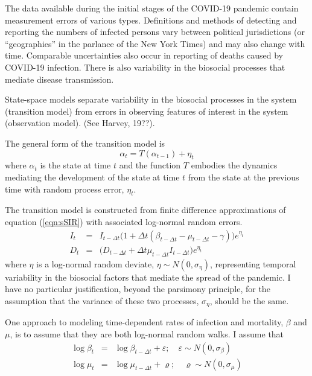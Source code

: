 \documentclass[12pt,letterpaper]{article}
\begin{document}
The data available during the initial stages of the COVID-19 pandemic
contain measurement errors of various types.
Definitions and methods of detecting and reporting the numbers of
infected persons vary between political jurisdictions (or
``geographies'' in the parlance of the New York Times) and may also
change with time.
Comparable uncertainties also occur in reporting of deaths caused
by COVID-19 infection.
There is also variability in the biosocial
processes that mediate disease transmission.

State-space models separate variability in the biosocial
processes in the system (transition model)
from errors in observing features of interest
in the system (observation model).
(See Harvey, 19??).

The general form of the transition model is
\begin{displaymath}
\alpha_t=T(\alpha_{t-1}) + \eta_t
\end{displaymath}
where $\alpha_t$ is the state at time $t$ and 
the function $T$ embodies the dynamics mediating the
development of the state at time $t$ from the state at the previous
time with random process error, $\eta_t$.

The transition model is constructed from finite difference
approximations of equation (\ref{eqn:sSIR}) with associated log-normal
random errors.
\begin{eqnarray}
\label{eqn:sSIRfd}
I_t &=& I_{t-\Delta t}\big(1+\Delta t(\beta_{t-\Delta t} - \mu_{t-\Delta t}
- \gamma)\big)e^{\eta_t}\\
D_t &=& \big(D_{t-\Delta t} + \Delta t \mu_{t-\Delta t}I_{t-\Delta
t}\big)e^{\eta_t}
\end{eqnarray}
where $\eta$ is a log-normal random deviate, $\eta\sim
N(0,\sigma_\eta)$, representing temporal variability in the biosocial
factors that mediate the spread of the pandemic. I have no particular
justification, beyond the parsimony principle, for the assumption that
the variance of these two processes, $\sigma_\eta$, should be the
same.

One approach to modeling time-dependent rates of infection and
mortality, $\beta$ and $\mu$, is to assume that they are both
log-normal random walks. I assume that
\begin{eqnarray}
\log\beta_t &=& \log\beta_{t-\Delta t}+\varepsilon;\quad \varepsilon\sim 
N(0,\sigma_\beta)\\
\log\mu_t &=& \log\mu_{t-\Delta t}+\varrho;\quad \varrho\sim
N(0,\sigma_\mu)
\end{eqnarray}
\end{document}
